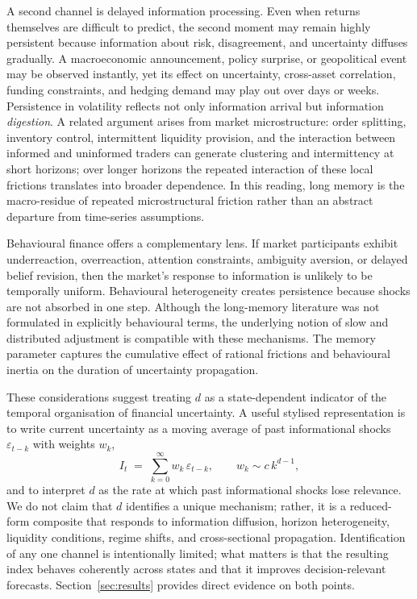 \documentclass[11pt,a4paper]{article}
\begin{document}
A second channel is delayed information processing. Even when returns
themselves are difficult to predict, the second moment may remain highly
persistent because information about risk, disagreement, and uncertainty
diffuses gradually. A macroeconomic announcement, policy surprise, or
geopolitical event may be observed instantly, yet its effect on
uncertainty, cross-asset correlation, funding constraints, and hedging
demand may play out over days or weeks. Persistence in volatility
reflects not only information arrival but information \emph{digestion}.
A related argument arises from market microstructure: order splitting,
inventory control, intermittent liquidity provision, and the interaction
between informed and uninformed traders can generate clustering and
intermittency at short horizons; over longer horizons the repeated
interaction of these local frictions translates into broader dependence.
In this reading, long memory is the macro-residue of repeated
microstructural friction rather than an abstract departure from
time-series assumptions.

Behavioural finance offers a complementary lens. If market participants
exhibit underreaction, overreaction, attention constraints, ambiguity
aversion, or delayed belief revision, then the market's response to
information is unlikely to be temporally uniform. Behavioural heterogeneity
creates persistence because shocks are not absorbed in one step.
Although the long-memory literature was not formulated in explicitly
behavioural terms, the underlying notion of slow and distributed
adjustment is compatible with these mechanisms. The memory parameter
captures the cumulative effect of rational frictions and behavioural
inertia on the duration of uncertainty propagation.

These considerations suggest treating $d$ as a state-dependent indicator
of the temporal organisation of financial uncertainty. A useful stylised
representation is to write current uncertainty as a moving average of past
informational shocks $\varepsilon_{t-k}$ with weights $w_k$,
\begin{equation}
  I_t \;=\; \sum_{k=0}^{\infty} w_k\, \varepsilon_{t-k}, \qquad
  w_k \sim c\, k^{d-1},
  \label{eq:info-persistence}
\end{equation}
and to interpret $d$ as the rate at which past informational shocks lose
relevance. We do not claim that $d$ identifies a unique mechanism; rather,
it is a reduced-form composite that responds to information diffusion,
horizon heterogeneity, liquidity conditions, regime shifts, and
cross-sectional propagation. Identification of any one channel is
intentionally limited; what matters is that the resulting index behaves
coherently across states and that it improves decision-relevant forecasts.
Section~\ref{sec:results} provides direct evidence on both points.
\end{document}
